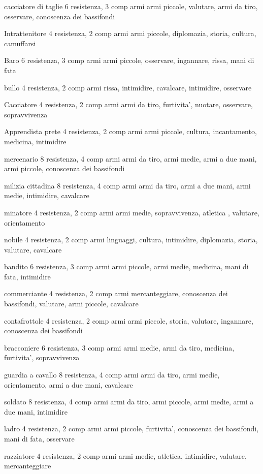 \documentclass[12pt,a4paper,twoside,openany]{book}
\begin{document}
cacciatore di taglie 6 resistenza, 3 comp armi
armi piccole, valutare, armi da tiro, osservare, conoscenza dei bassifondi

Intrattenitore 4 resistenza, 2 comp armi
armi piccole, diplomazia, storia, cultura, camuffarsi

Baro  6 resistenza, 3 comp armi
armi piccole, osservare, ingannare, rissa, mani di fata

bullo 4 resistenza, 2 comp armi
rissa, intimidire, cavalcare, intimidire,  osservare

Cacciatore 4 resistenza, 2 comp armi
armi da tiro, furtivita', nuotare,  osservare, sopravvivenza

Apprendista prete 4 resistenza, 2 comp armi
armi piccole, cultura, incantamento, medicina, intimidire

mercenario 8 resistenza, 4 comp armi
armi da tiro, armi medie, armi a due mani, armi piccole, conoscenza dei bassifondi

milizia cittadina   8 resistenza, 4 comp armi
armi da tiro, armi a due mani, armi medie, intimidire, cavalcare

minatore  4 resistenza, 2 comp armi
armi medie, sopravvivenza, atletica , valutare, orientamento

nobile 4 resistenza, 2 comp armi
linguaggi, cultura, intimidire,  diplomazia, storia, valutare, cavalcare

bandito  6 resistenza, 3 comp armi
armi piccole, armi medie, medicina, mani di fata, intimidire

commerciante  4 resistenza, 2 comp armi
mercanteggiare, conoscenza dei bassifondi, valutare, armi piccole, cavalcare

contafrottole  4 resistenza, 2 comp armi
armi piccole, storia, valutare, ingannare, conoscenza dei bassifondi

bracconiere  6 resistenza, 3 comp armi
armi medie, armi da tiro, medicina, furtivita', sopravvivenza

guardia a cavallo 8 resistenza, 4 comp armi
armi da tiro, armi medie, orientamento, armi a due mani, cavalcare

soldato 8 resistenza, 4 comp armi
armi da tiro, armi piccole, armi medie, armi a due mani, intimidire

ladro  4 resistenza, 2 comp armi
armi piccole, furtivita', conoscenza dei bassifondi, mani di fata, osservare

razziatore  4 resistenza, 2 comp armi
armi medie, atletica, intimidire, valutare,  mercanteggiare
\end{document}
